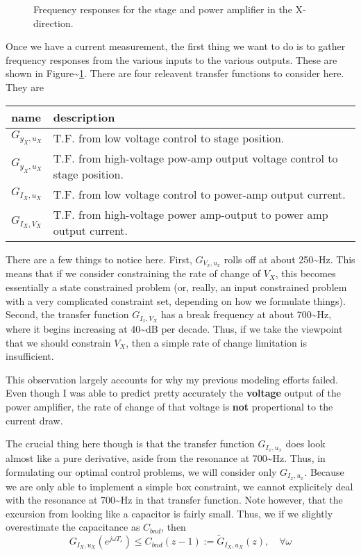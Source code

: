 \documentclass[journal,12pt,twocolumn,twoside]{IEEEtran/IEEEtran}
\begin{document}
\begin{figure}[htbp]
\centering

\caption{\label{fig:org8f9b1d0}
Frequency responses for the stage and power amplifier in the X-direction.}
\end{figure}


Once we have a current measurement, the first thing we want to do is to gather frequency responses from the various inputs to the various outputs. These are shown in Figure\textasciitilde{}\ref{fig:org8f9b1d0}. There are four releavent transfer functions to consider here. They are

\begin{table}
  \centering
  \begin{tabular}{ll}
    name & description\\
    \hline
    \(G_{y_{X},u_{X}}\) & T.F. from low voltage control to stage position.\\
    \(G_{y_{X},u_{X}}\) & T.F. from high-voltage pow-amp output voltage control to stage position.\\
    \(G_{I_{X},u_{X}}\) & T.F. from low voltage control to power-amp output current.\\
    \(G_{I_{X},V_{X}}\) & T.F. from high-voltage power amp-output to power amp output current.\\
  \end{tabular}
\end{table}
There are a few things to notice here. First, \(G_{V_{x},u_{x}}\) rolls off at about 250\textasciitilde{}Hz. This means that if we consider constraining the rate of change of \(V_{X}\), this becomes essentially a state constrained problem (or, really, an input constrained problem with a very complicated constraint set, depending on how we formulate things). Second, the transfer function \(G_{I_{x}, V_{X}}\) has a break frequency at about 700\textasciitilde{}Hz, where it begins increasing at 40\textasciitilde{}dB per decade. Thus, if we take the viewpoint that we should constrain \(V_{X}\), then a simple rate of change limitation is insufficient. 

This observation largely accounts for why my previous modeling efforts failed. Even though I was able to predict pretty accurately the \textbf{voltage} output of the power amplifier, the rate of change of that voltage is \textbf{not} propertional to the current draw.

The crucial thing here though is that the transfer function \(G_{I_{x},u_{x}}\) does look almost like a pure derivative, aside from the resonance at 700\textasciitilde{}Hz. Thus, in formulating our optimal control problems, we will consider only \(G_{I_{x},u_{x}}\). Because we are only able to implement a simple box constraint, we cannot explicitely deal with the resonance at 700\textasciitilde{}Hz in that transfer function. Note however, that the excursion from looking like a capacitor is fairly small. Thus, we if we slightly overestimate the capacitance as \(C_{bnd}\), then 
\begin{equation}
G_{I_{X},u_{X}}(e^{j\omega T_{s}}) \leq C_{bnd}(z-1) := \tilde{G}_{I_{X}, u_{X}}(z), \quad \forall \omega
\end{equation}
\end{document}

